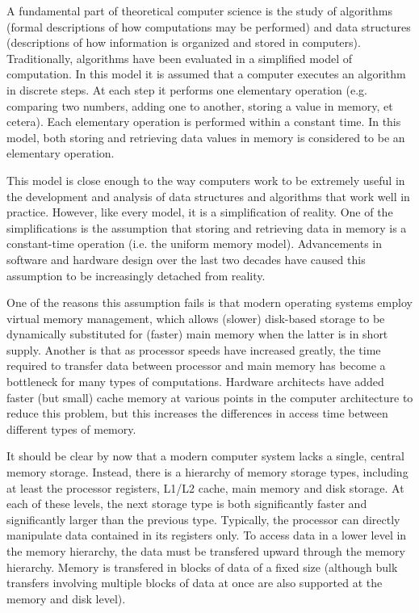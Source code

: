 \documentclass{acm_proc_article-sp}
\begin{document}
A fundamental part of theoretical computer science is the study of algorithms (formal descriptions of how computations may be performed) and data structures (descriptions of how information is organized and stored in computers). Traditionally, algorithms have been evaluated in a simplified model of computation. In this model it is assumed that a computer executes an algorithm in discrete steps. At each step it performs one elementary operation (e.g. comparing two numbers, adding one to another, storing a value in memory, et cetera). Each elementary operation is performed within a constant time. In this model, both storing and retrieving data values in memory is considered to be an elementary operation.

This model is close enough to the way computers work to be extremely useful in the development and analysis of data structures and algorithms that work well in practice. However, like every model, it is a simplification of reality. One of the simplifications is the assumption that storing and retrieving data in memory is a constant-time operation (i.e. the uniform memory model). Advancements in software and hardware design over the last two decades have caused this assumption to be increasingly detached from reality.

One of the reasons this assumption fails is that modern operating systems employ virtual memory management, which allows (slower) disk-based storage to be dynamically substituted for (faster) main memory when the latter is in short supply. Another is that as processor speeds have increased greatly, the time required to transfer data between processor and main memory has become a bottleneck for many types of computations. Hardware architects have added faster (but small) cache memory at various points in the computer architecture to reduce this problem, but this increases the differences in access time between different types of memory.

It should be clear by now that a modern computer system lacks a single, central memory storage. Instead, there is a hierarchy of memory storage types, including at least the processor registers, L1/L2 cache, main memory and disk storage. At each of these levels, the next storage type is both significantly faster and significantly larger than the previous type. Typically, the processor can directly manipulate data contained in its registers only. To access data in a lower level in the memory hierarchy, the data must be transfered upward through the memory hierarchy. Memory is transfered in blocks of data of a fixed size (although bulk transfers involving multiple blocks of data at once are also supported at the memory and disk level).
\end{document}
